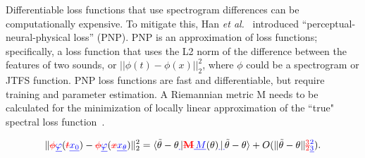\documentclass[lettersize,journal]{IEEEtran}
\makeatletter
\renewcommand{\DIFadd}[1]{\textcolor{blue}{\uline{#1}}}
\renewcommand{\DIFdel}[1]{\textcolor{red}{\sout{#1}}}
\newcommand{\xtheta}{x_{\theta}} %
\newcommand{\xzero}{x_{0}}       %
\providecommand{\DIFadd}[1]{{\protect\color{blue}\uwave{#1}}} %
\providecommand{\DIFdel}[1]{{\protect\color{red}\sout{#1}}} %
\providecommand{\DIFaddbegin}{} %
\providecommand{\DIFaddend}{} %
\providecommand{\DIFdelbegin}{} %
\providecommand{\DIFdelend}{} %
\providecommand{\DIFscaledelfig}{0.5}
\newlength{\DIFdelgraphicswidth} %
\newlength{\DIFdelgraphicsheight} %
\providecommand{\DIFaddincludegraphics}[2][]{{\color{blue}\fbox{\DIFOincludegraphics[#1]{#2}}}} %
\providecommand{\DIFdelincludegraphics}[2][]{%
\sbox{\DIFdelgraphicsbox}{\DIFOincludegraphics[#1]{#2}}%
\settoboxwidth{\DIFdelgraphicswidth}{\DIFdelgraphicsbox} %
\settoboxtotalheight{\DIFdelgraphicsheight}{\DIFdelgraphicsbox} %
\scalebox{\DIFscaledelfig}{%
\parbox[b]{\DIFdelgraphicswidth}{\usebox{\DIFdelgraphicsbox}\\[-\baselineskip] \rule{\DIFdelgraphicswidth}{0em}}\llap{\resizebox{\DIFdelgraphicswidth}{\DIFdelgraphicsheight}{%
\setlength{\unitlength}{\DIFdelgraphicswidth}%
\begin{picture}(1,1)%
\thicklines\linethickness{2pt} %
{\color[rgb]{1,0,0}\put(0,0){\framebox(1,1){}}}%
{\color[rgb]{1,0,0}\put(0,0){\line( 1,1){1}}}%
{\color[rgb]{1,0,0}\put(0,1){\line(1,-1){1}}}%
\end{picture}%
}\hspace*{3pt}}} %
} %
\DeclareRobustCommand{\DIFaddbegin}{\DIFOaddbegin \let\includegraphics\DIFaddincludegraphics} %
\DeclareRobustCommand{\DIFaddend}{\DIFOaddend \let\includegraphics\DIFOincludegraphics} %
\DeclareRobustCommand{\DIFdelbegin}{\DIFOdelbegin \let\includegraphics\DIFdelincludegraphics} %
\DeclareRobustCommand{\DIFdelend}{\DIFOaddend \let\includegraphics\DIFOincludegraphics} %
\let\sout@orig\sout %
\renewcommand{\sout}[1]{\ifmmode\text{\sout@orig{\ensuremath{#1}}}\else\sout@orig{#1}\fi} %
\makeatother
\begin{document}
\DIFdelbegin %

\DIFdelend Differentiable loss functions that use spectrogram differences can be computationally expensive. To mitigate this, Han \textit{et al.}~\cite{han2023perceptual} introduced ``perceptual-neural-physical loss'' (PNP). PNP is an approximation of loss functions; specifically, a loss function that uses the L2 norm of the difference between the features of two sounds, or $||\phi(t) - \phi(x)||^2_2$, where $\phi$ could be a spectrogram or JTFS function. PNP loss functions are fast and differentiable, but require training and parameter estimation. A Riemannian metric M needs to be calculated for the minimization of locally linear approximation of the ``true" spectral loss function~\cite{han2023perceptual}. 
\DIFaddbegin 

\DIFaddend \[
\| \DIFdelbegin \DIFdel{\phi}\DIFdelend \DIFaddbegin \DIFadd{\varphi}\DIFaddend (\DIFdelbegin \DIFdel{t}\DIFdelend \DIFaddbegin \DIFadd{\xzero}\DIFaddend ) - \DIFdelbegin \DIFdel{\phi}\DIFdelend \DIFaddbegin \DIFadd{\varphi}\DIFaddend (\DIFdelbegin \DIFdel{x}\DIFdelend \DIFaddbegin \DIFadd{\xtheta}\DIFaddend ) \|_2^2
= \langle \tilde{\theta} - \theta \DIFaddbegin \DIFadd{\,}\DIFaddend |\DIFdelbegin \DIFdel{\mathbf{M}}\DIFdelend \DIFaddbegin \DIFadd{\, M}\DIFaddend (\theta) \DIFaddbegin \DIFadd{\,}\DIFaddend |\DIFaddbegin \DIFadd{\, }\DIFaddend \tilde{\theta} - \theta \rangle
+ O(\|\tilde{\theta} - \theta\|\DIFdelbegin \DIFdel{_2^3}\DIFdelend \DIFaddbegin \DIFadd{_3^2}\DIFaddend ).
\DIFdelbegin %
\DIFdelend \]
\end{document}
